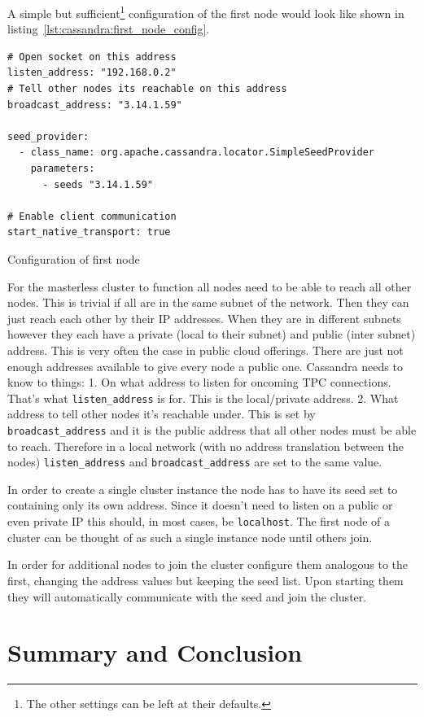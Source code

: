 A simple but sufficient\footnote{The other settings can be left at their defaults.} configuration of the first node would look like shown in listing~\ref{lst:cassandra:first_node_config}.

\begin{listing}[ht]
  \begin{verbatim}
# Open socket on this address
listen_address: "192.168.0.2"
# Tell other nodes its reachable on this address
broadcast_address: "3.14.1.59"

seed_provider:
  - class_name: org.apache.cassandra.locator.SimpleSeedProvider
    parameters:
      - seeds "3.14.1.59"

# Enable client communication
start_native_transport: true
  \end{verbatim}
  \caption{Configuration of first node}
  \label{lst:cassandra:first_node_config}
\end{listing}

For the masterless cluster to function all nodes need to be able to reach all other nodes. This is trivial if all are in the same subnet of the network. Then they can just reach each other by their IP addresses.
When they are in different subnets however they each have a private (local to their subnet) and public (inter subnet) address. This is very often the case in public cloud offerings. There are just not enough addresses available to give every node a public one.
Cassandra needs to know to things:
1. On what address to listen for oncoming TPC connections. That's what \texttt{listen\_address} is for. This is the local/private address.
2. What address to tell other nodes it's reachable under. This is set by \texttt{broadcast\_address} and it is the public address that all other nodes must be able to reach.
Therefore in a local network (with no address translation between the nodes) \texttt{listen\_address} and \texttt{broadcast\_address} are set to the same value.

In order to create a single cluster instance the node has to have its seed set to containing only its own address. Since it doesn't need to listen on a public or even private IP this should, in most cases, be \texttt{localhost}.
The first node of a cluster can be thought of as such a single instance node until others join.

In order for additional nodes to join the cluster configure them analogous to the first, changing the address values but keeping the seed list.
Upon starting them they will automatically communicate with the seed and join the cluster.

\section{Summary and Conclusion}

\cite{cassandra_paper}
